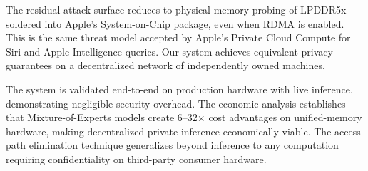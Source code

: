 \documentclass[10pt,twocolumn,letterpaper]{article}
\begin{document}
The residual attack surface reduces to physical memory probing of LPDDR5x soldered into Apple's System-on-Chip package, even when RDMA is enabled. This is the same threat model accepted by Apple's Private Cloud Compute for Siri and Apple Intelligence queries. Our system achieves equivalent privacy guarantees on a decentralized network of independently owned machines.

The system is validated end-to-end on production hardware with live inference, demonstrating negligible security overhead. The economic analysis establishes that Mixture-of-Experts models create 6--32$\times$ cost advantages on unified-memory hardware, making decentralized private inference economically viable. The access path elimination technique generalizes beyond inference to any computation requiring confidentiality on third-party consumer hardware.
\end{document}
